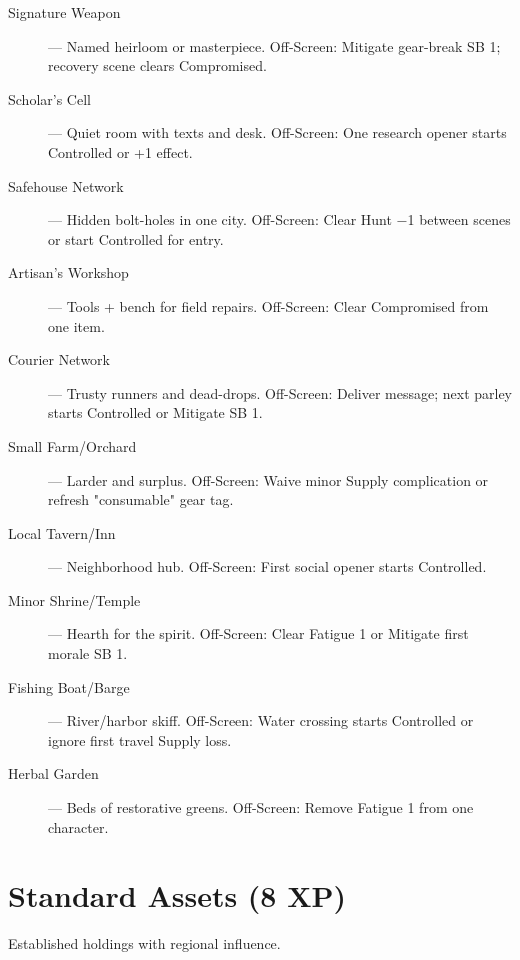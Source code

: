 \begin{description}
  \item[Signature Weapon] — Named heirloom or masterpiece. Off-Screen: Mitigate gear-break SB 1; recovery scene clears Compromised.
  \item[Scholar's Cell] — Quiet room with texts and desk. Off-Screen: One research opener starts Controlled or +1 effect.
  \item[Safehouse Network] — Hidden bolt-holes in one city. Off-Screen: Clear Hunt −1 between scenes or start Controlled for entry.
  \item[Artisan's Workshop] — Tools + bench for field repairs. Off-Screen: Clear Compromised from one item.
  \item[Courier Network] — Trusty runners and dead-drops. Off-Screen: Deliver message; next parley starts Controlled or Mitigate SB 1.
  \item[Small Farm/Orchard] — Larder and surplus. Off-Screen: Waive minor Supply complication or refresh "consumable" gear tag.
  \item[Local Tavern/Inn] — Neighborhood hub. Off-Screen: First social opener starts Controlled.
  \item[Minor Shrine/Temple] — Hearth for the spirit. Off-Screen: Clear Fatigue 1 or Mitigate first morale SB 1.
  \item[Fishing Boat/Barge] — River/harbor skiff. Off-Screen: Water crossing starts Controlled or ignore first travel Supply loss.
  \item[Herbal Garden] — Beds of restorative greens. Off-Screen: Remove Fatigue 1 from one character.
\end{description}

\section{Standard Assets (8 XP)}

Established holdings with regional influence.

